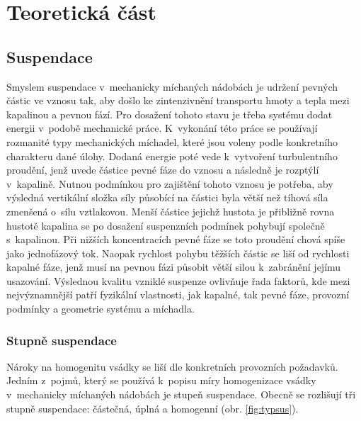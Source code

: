 \chapter{Teoretická část}
\section{Suspendace}
Smyslem suspendace v~mechanicky míchaných nádobách je udržení pevných částic ve vznosu tak, aby došlo ke zintenzivnění transportu hmoty a tepla mezi kapalinou a pevnou fází. Pro dosažení tohoto stavu je třeba systému dodat energii v~podobě mechanické práce. K~vykonání této práce se používají rozmanité typy mechanických míchadel, které jsou voleny podle konkretního charakteru dané úlohy. Dodaná energie poté vede k~vytvoření turbulentního proudění, jenž uvede částice pevné fáze do vznosu a následně je rozptýlí v~kapalině. Nutnou podmínkou pro zajištění tohoto vznosu je potřeba, aby výsledná vertikální složka síly působící na částici byla větší než tíhová síla zmenšená o~sílu vztlakovou. Menší částice jejichž hustota je přibližně rovna hustotě kapalina se po dosažení suspenzních podmínek pohybují společně s~kapalinou. Při nižších koncentracích pevné fáze se toto proudění chová spíše jako jednofázový tok. Naopak rychlost pohybu těžších částic se liší od rychlosti kapalné fáze, jenž musí na pevnou fázi působit větší silou k~zabránění jejímu usazování. Výslednou kvalitu vzniklé suspenze ovlivňuje řada faktorů, kde mezi nejvýznamnější patří fyzikální vlastnosti, jak kapalné, tak pevné fáze, provozní podmínky a geometrie systému a míchadla.

\subsection{Stupně suspendace}
Nároky na homogenitu vsádky se liší dle konkretních provozních požadavků. Jedním z~pojmů, který se používá k~popisu míry homogenizace vsádky v~mechanicky míchaných nádobách je stupeň suspendace. Obecně se rozlišují tři stupně suspendace: částečná, úplná a homogenní (obr. \ref{fig:typsus}). 
  
